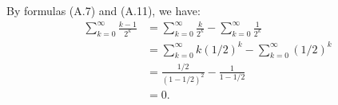 By formulas (A.7) and (A.11), we have:
\begin{align*}
    \sum_{k=0}^\infty\frac{k-1}{2^k} &= \sum_{k=0}^\infty\frac{k}{2^k} - \sum_{k=0}^\infty\frac{1}{2^k} \\
    &= \sum_{k=0}^\infty k(1/2)^k - \sum_{k=0}^\infty(1/2)^k \\
    &= \frac{1/2}{(1-1/2)^2} - \frac{1}{1-1/2} \\
    &= 0.
\end{align*}

